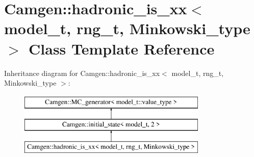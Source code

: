 \hypertarget{a00257}{\section{Camgen\-:\-:hadronic\-\_\-is\-\_\-xx$<$ model\-\_\-t, rng\-\_\-t, Minkowski\-\_\-type $>$ Class Template Reference}
\label{a00257}
}
Inheritance diagram for Camgen\-:\-:hadronic\-\_\-is\-\_\-xx$<$ model\-\_\-t, rng\-\_\-t, Minkowski\-\_\-type $>$\-:\begin{figure}[H]
\begin{center}
\leavevmode
\includegraphics[height=3.000000cm]{a00257}
\end{center}
\end{figure}
